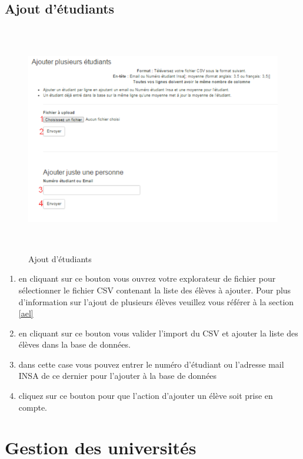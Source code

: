           \subsection{Ajout d'étudiants}
          \label{aet}
          \begin{figure}[H]
          	\centering
          	\includegraphics[width=14cm,height=10cm]{Images/Admin/ajout_etud_admin.png}
          	\caption{Ajout d'étudiants}
          	
          \end{figure}
          \begin{enumerate}
          	\item en cliquant sur ce bouton vous ouvrez votre explorateur de fichier pour sélectionner le fichier CSV contenant la liste des élèves à ajouter. Pour plus d'information sur l'ajout de plusieurs élèves veuillez vous référer à la section \ref{ael}
          	\item en cliquant sur ce bouton vous valider l'import du CSV et ajouter la liste des élèves dans la base de données.
          	\item dans cette case vous pouvez entrer le numéro d'étudiant ou l'adresse mail INSA de ce dernier pour l'ajouter à la base de données
          	\item cliquez sur ce bouton pour que l'action d'ajouter un élève soit prise en compte.
          \end{enumerate}
               
        


\section{Gestion des universités}

